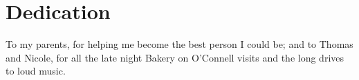 \chapter{Dedication}
\label{ch:dedication}
To my parents, for helping me become the best person I could be; 
and to Thomas and Nicole, for all the late night Bakery on O'Connell visits and the long drives to loud music.


